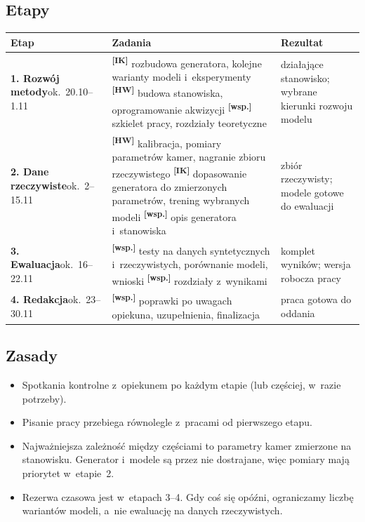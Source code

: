 \documentclass[11pt,a4paper]{article}
\newcommand{\IK}{\textsuperscript{\textbf{[IK]}}}
\newcommand{\HW}{\textsuperscript{\textbf{[HW]}}}
\newcommand{\WS}{\textsuperscript{\textbf{[wsp.]}}}
\begin{document}
\subsection*{Etapy}
\begin{center}
\small
\begin{tabularx}{\linewidth}{>{\raggedright\arraybackslash}p{3.0cm}YY}
\toprule
\textbf{Etap} & \textbf{Zadania} & \textbf{Rezultat} \\
\midrule
\textbf{1. Rozwój metody}\newline\footnotesize ok.\ 20.10--1.11 &
  \IK{} rozbudowa generatora, kolejne warianty modeli i~eksperymenty\newline
  \HW{} budowa stanowiska, oprogramowanie akwizycji\newline
  \WS{} szkielet pracy, rozdziały teoretyczne &
  działające stanowisko; wybrane kierunki rozwoju modelu \\
\addlinespace
\textbf{2. Dane rzeczywiste}\newline\footnotesize ok.\ 2--15.11 &
  \HW{} kalibracja, pomiary parametrów kamer, nagranie zbioru rzeczywistego\newline
  \IK{} dopasowanie generatora do zmierzonych parametrów, trening wybranych modeli\newline
  \WS{} opis generatora i~stanowiska &
  zbiór rzeczywisty; modele gotowe do ewaluacji \\
\addlinespace
\textbf{3. Ewaluacja}\newline\footnotesize ok.\ 16--22.11 &
  \WS{} testy na danych syntetycznych i~rzeczywistych, porównanie modeli, wnioski\newline
  \WS{} rozdziały z~wynikami &
  komplet wyników; wersja robocza pracy \\
\addlinespace
\textbf{4. Redakcja}\newline\footnotesize ok.\ 23--30.11 &
  \WS{} poprawki po uwagach opiekuna, uzupełnienia, finalizacja &
  praca gotowa do oddania \\
\bottomrule
\end{tabularx}
\end{center}

\subsection*{Zasady}
\begin{itemize}
  \item Spotkania kontrolne z~opiekunem po każdym etapie (lub częściej, w~razie potrzeby).
  \item Pisanie pracy przebiega równolegle z~pracami od pierwszego etapu.
  \item Najważniejsza zależność między częściami to parametry kamer zmierzone na stanowisku.
        Generator i~modele są przez nie dostrajane, więc pomiary mają priorytet w~etapie~2.
  \item Rezerwa czasowa jest w~etapach 3--4. Gdy coś się opóźni, ograniczamy liczbę wariantów
        modeli, a~nie ewaluację na danych rzeczywistych.
\end{itemize}
\end{document}
